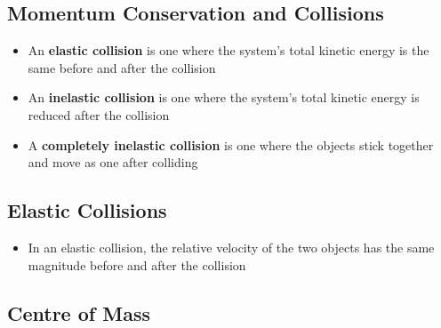 \documentclass{article}
\begin{document}
\subsection{Momentum Conservation and Collisions}

\begin{itemize}
  \item An \textbf{elastic collision} is one where the system's total kinetic energy is the same before and after the collision

  \item An \textbf{inelastic collision} is one where the system's total kinetic energy is reduced after the collision

  \item A \textbf{completely inelastic collision} is one where the objects stick together and move as one after colliding
\end{itemize}

\subsection{Elastic Collisions}

\begin{itemize}
  \item In an elastic collision, the relative velocity of the two objects has the same magnitude before and after the collision
\end{itemize}

\subsection{Centre of Mass}
\end{document}
